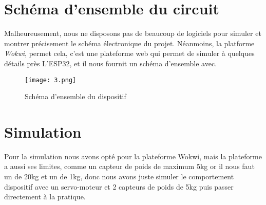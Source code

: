 \section{Schéma d'ensemble du circuit}
Malheureusement, nous ne disposons pas de beaucoup de logiciels pour simuler et montrer précisement le schéma électronique du projet. Néanmoins, la platforme \textit{Wokwi}, permet cela, c'est une plateforme web qui permet de simuler à quelques détails près L'ESP32, et il nous fournit un schéma d'ensemble avec.\\[0.3cm]

\begin{figure}[H]
	\centering
	\texttt{[image: 3.png]}
	\caption{Schéma d'ensemble du dispositif}
\end{figure}

\section{Simulation}
Pour la simulation nous avons opté pour la plateforme Wokwi, mais la plateforme a aussi ses limites, comme un capteur de poids de maximum 5kg or il nous faut un de 20kg et un de 1kg, donc nous avons juste simuler le comportement dispositif avec un servo-moteur et 2 capteurs de poids de 5kg puis passer directement à la pratique.
